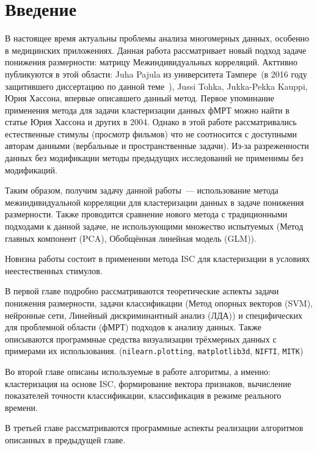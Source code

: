 \chapter*{Введение}
\label{sec:afterwords}

В настоящее время актуальны проблемы анализа многомерных данных, особенно в медицинских приложениях.
Данная работа рассматривает новый подход задаче понижения размерности: матрицу Межиндивидуальных корреляций. Акттивно публикуются в этой области: Juha Pajula из университета Тампере~(в 2016 году защитившего диссертацию по данной теме \cite{pajula_ISC_thes}\,), Jussi Tohka, Jukka-Pekka Kauppi, Юрия Хассона, впервые описавшего данный метод. Первое упоминание применения метода для задачи кластеризации данных фМРТ можно найти в статье Юрия Хассона и других в 2004\cite{Hasson1634}.
Однако в этой работе рассматривались естественные стимулы (просмотр фильмов) что не соотносится с доступными авторам данными (вербальные и пространственные задачи). Из-за разреженности данных без модификации методы
предыдущих исследований не применимы без модификаций.

Таким образом, получим задачу данной работы~--- использование метода межиндивидуальной корреляции для кластеризации данных в задаче понижения размерности. Также проводится сравнение нового метода с традиционными подходами к данной задаче, не использующими множество испытуемых (Метод главных компонент (PCA), Обобщённая линейная модель (GLM)).

Новизна работы состоит в применении метода ISC для кластеризации в условиях неестественных стимулов.

В первой главе подробно рассматриваются теоретические аспекты задачи понижения размерности, задачи классификации (Метод опорных векторов (SVM), нейронные сети, Линейный дискриминантный анализ (ЛДА)) и специфических для проблемной области (фМРТ) подходов к анализу данных. Также описываются программные средства визуализации трёхмерных данных с примерами их использования. (\verb|nilearn.plotting|\cite{10.3389/fninf.2014.00014}, \verb|matplotlib3d|\cite{Hunter:2007}, \verb|NIFTI|, \verb|MITK|\cite{wolf2004medical})

Во второй главе описаны используемые в работе алгоритмы, а именно: кластеризация на основе ISC, формирование вектора признаков, вычисление показателей точности классификации, классификация в режиме реального времени.

В третьей главе рассматриваются программные аспекты реализации алгоритмов описанных в предыдущей главе.

